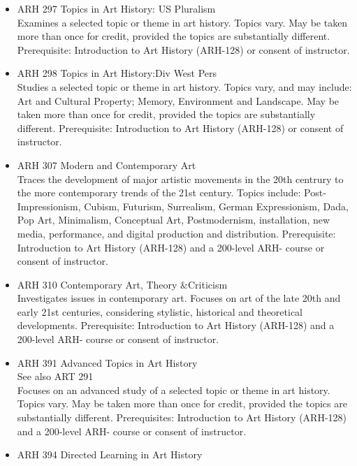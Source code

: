 \documentclass[
  letterpaper,
]{scrbook}
\begin{document}
\begin{itemize}
\item
  ARH 297 Topics in Art History: US Pluralism\\
  Examines a selected topic or theme in art history. Topics vary. May be
  taken more than once for credit, provided the topics are substantially
  different. Prerequisite: Introduction to Art History (ARH-128) or
  consent of instructor.\\
\item
  ARH 298 Topics in Art History:Div West Pers\\
  Studies a selected topic or theme in art history. Topics vary, and may
  include: Art and Cultural Property; Memory, Environment and Landscape.
  May be taken more than once for credit, provided the topics are
  substantially different. Prerequisite: Introduction to Art History
  (ARH-128) or consent of instructor.\\
\item
  ARH 307 Modern and Contemporary Art\\
  Traces the development of major artistic movements in the 20th
  centrury to the more contemporary trends of the 21st century. Topics
  include: Post-Impressionism, Cubism, Futurism, Surrealism, German
  Expressionism, Dada, Pop Art, Minimalism, Conceptual Art,
  Postmodernism, installation, new media, performance, and digital
  production and distribution. Prerequisite: Introduction to Art History
  (ARH-128) and a 200-level ARH- course or consent of instructor.\\
\item
  ARH 310 Contemporary Art, Theory \&Criticism\\
  Investigates issues in contemporary art. Focuses on art of the late
  20th and early 21st centuries, considering stylistic, historical and
  theoretical developments. Prerequisite: Introduction to Art History
  (ARH-128) and a 200-level ARH- course or consent of instructor.\\
\item
  ARH 391 Advanced Topics in Art History\\
  See also ART 291\\
  Focuses on an advanced study of a selected topic or theme in art
  history. Topics vary. May be taken more than once for credit, provided
  the topics are substantially different. Prerequisites: Introduction to
  Art History (ARH-128) and a 200-level ARH- course or consent of
  instructor.\\
\item
  ARH 394 Directed Learning in Art History\\

\end{itemize}
\end{document}
